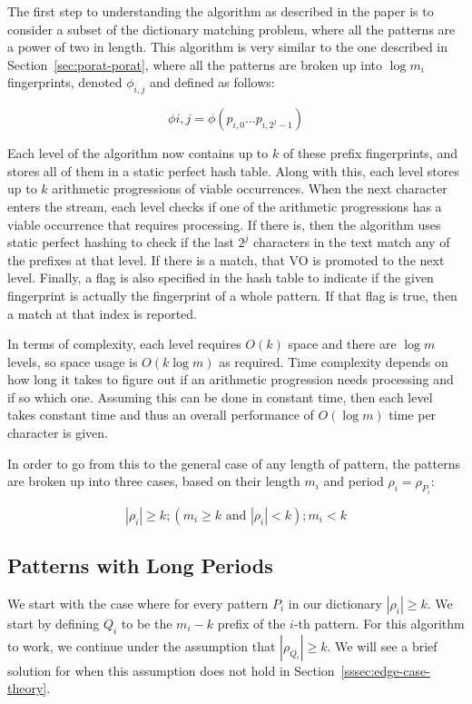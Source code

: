 \documentclass[ %
                    author={Dominic Joseph Moylett},
                    degree={MEng},
                     title={Dictionary Matching with Fingerprints},
                  subtitle={An Empirical Analysis},
                      type={Research},
                      year={2014} ]{dissertation}
\begin{document}
The first step to understanding the algorithm as described in the paper is to consider a subset of the dictionary matching problem, where all the patterns are a power of two in length. This algorithm is very similar to the one described in Section~\ref{sec:porat-porat}, where all the patterns are broken up into $\log m_i$ fingerprints, denoted $\phi_{i,j}$ and defined as follows:

$$\phi{i,j} = \phi(p_{i,0}...p_{i,2^j-1})$$

Each level of the algorithm now contains up to $k$ of these prefix fingerprints, and stores all of them in a static perfect hash table. Along with this, each level stores up to $k$ arithmetic progressions of viable occurrences. When the next character enters the stream, each level checks if one of the arithmetic progressions has a viable occurrence that requires processing. If there is, then the algorithm uses static perfect hashing to check if the last $2^j$ characters in the text match any of the prefixes at that level. If there is a match, that VO is promoted to the next level. Finally, a flag is also specified in the hash table to indicate if the given fingerprint is actually the fingerprint of a whole pattern. If that flag is true, then a match at that index is reported.

In terms of complexity, each level requires $O(k)$ space and there are $\log m$ levels, so space usage is $O(k\log m)$ as required. Time complexity depends on how long it takes to figure out if an arithmetic progression needs processing and if so which one. Assuming this can be done in constant time, then each level takes constant time and thus an overall performance of $O(\log m)$ time per character is given.

In order to go from this to the general case of any length of pattern, the patterns are broken up into three cases, based on their length $m_i$ and period $\rho_i = \rho_{P_i}$:

$$|\rho_i| \geq k; (m_i \geq k \text{ and } |\rho_i| < k); m_i < k$$

\subsection{Patterns with Long Periods}
\label{ssec:long-theory}

We start with the case where for every pattern $P_i$ in our dictionary $|\rho_i| \geq k$. We start by defining $Q_i$ to be the $m_i - k$ prefix of the $i$-th pattern. For this algorithm to work, we continue under the assumption that $|\rho_{Q_i}| \geq k$. We will see a brief solution for when this assumption does not hold in Section~\ref{sssec:edge-case-theory}.
\end{document}
